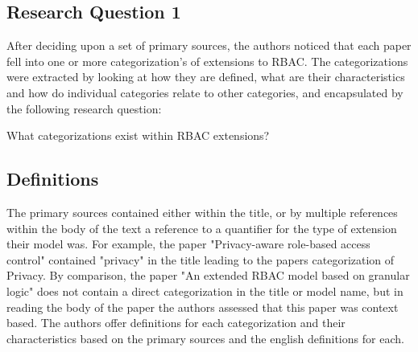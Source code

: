 \subsection{Research Question 1}

After deciding upon a set of primary sources, the authors noticed that each paper fell into one or more categorization's of extensions to RBAC.
The categorizations were extracted by looking at how they are defined, what are their characteristics and how do individual categories relate
to other categories, and encapsulated by the following research question:

What categorizations exist within RBAC extensions? \\

\subsection{Definitions}

The primary sources contained either within the title, or by multiple references within the body of the text a reference to a quantifier for the
type of extension their model was.  For example, the paper "Privacy-aware role-based access control" \cite{ni2010privacy} contained "privacy" in
the title leading to the papers categorization of Privacy.  By comparison, the paper "An extended RBAC model based on granular logic" \cite{jian2008extended}
does not contain a direct categorization in the title or model name, but in reading the body of the paper the authors assessed that this paper was 
context based.  The authors offer definitions for each categorization and their characteristics based on the primary sources and the english definitions
for each.


